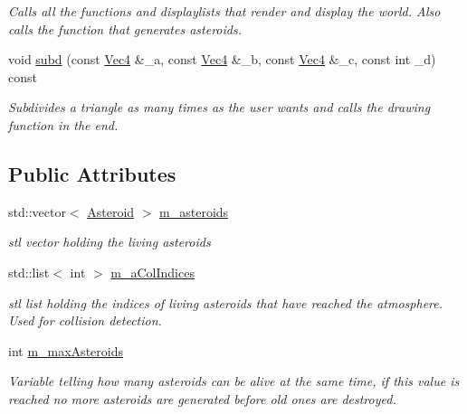 \begin{DoxyCompactItemize}
\begin{DoxyCompactList}\small\item\em Calls all the functions and displaylists that render and display the world. Also calls the function that generates asteroids. \item\end{DoxyCompactList}\item 
void \hyperlink{classWorld_a3bd949dfe9a3281fdf3e2523ed69942a}{subd} (const \hyperlink{classVec4}{Vec4} \&\_\-a, const \hyperlink{classVec4}{Vec4} \&\_\-b, const \hyperlink{classVec4}{Vec4} \&\_\-c, const int \_\-d) const 
\begin{DoxyCompactList}\small\item\em Subdivides a triangle as many times as the user wants and calls the drawing function in the end. \item\end{DoxyCompactList}\end{DoxyCompactItemize}
\subsection*{Public Attributes}
\begin{DoxyCompactItemize}
\item 
\hypertarget{classWorld_adda9a4f4bf708b6d2b81cb70b139228c}{
std::vector$<$ \hyperlink{classAsteroid}{Asteroid} $>$ \hyperlink{classWorld_adda9a4f4bf708b6d2b81cb70b139228c}{m\_\-asteroids}}
\label{classWorld_adda9a4f4bf708b6d2b81cb70b139228c}

\begin{DoxyCompactList}\small\item\em stl vector holding the living asteroids \item\end{DoxyCompactList}\item 
\hypertarget{classWorld_a08591bf1d4b62d09c4060a7dc159f495}{
std::list$<$ int $>$ \hyperlink{classWorld_a08591bf1d4b62d09c4060a7dc159f495}{m\_\-aColIndices}}
\label{classWorld_a08591bf1d4b62d09c4060a7dc159f495}

\begin{DoxyCompactList}\small\item\em stl list holding the indices of living asteroids that have reached the atmosphere. Used for collision detection. \item\end{DoxyCompactList}\item 
\hypertarget{classWorld_a22414b5f75b734ff457850a05229d305}{
int \hyperlink{classWorld_a22414b5f75b734ff457850a05229d305}{m\_\-maxAsteroids}}
\label{classWorld_a22414b5f75b734ff457850a05229d305}

\begin{DoxyCompactList}\small\item\em Variable telling how many asteroids can be alive at the same time, if this value is reached no more asteroids are generated before old ones are destroyed. \item\end{DoxyCompactList}\end{DoxyCompactItemize}
